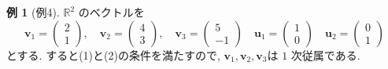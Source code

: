 \documentclass[dvipdfmx,a4paper,11pt]{article} %
\theoremstyle{definition}
\newtheorem{eg}[thm]{例}
\begin{document}
\begin{eg}[例4]
\(\mathbb{R}^2\) のベクトルを
\[
\bm{v}_1=\begin{pmatrix}2\\1\end{pmatrix},
\quad
\bm{v}_2=\begin{pmatrix}4\\3\end{pmatrix},
\quad
\bm{v}_3=\begin{pmatrix}5\\-1\end{pmatrix}
\quad
\bm{u}_1 =\begin{pmatrix}1\\0\end{pmatrix}
\quad
\bm{u}_2 =\begin{pmatrix}0\\1\end{pmatrix}
\]
とする.
すると(1)と(2)の条件を満たすので, 
$\bm{v}_1, \bm{v}_2, \bm{v}_3$は \(1\) 次従属である.


\end{eg}
\end{document}
